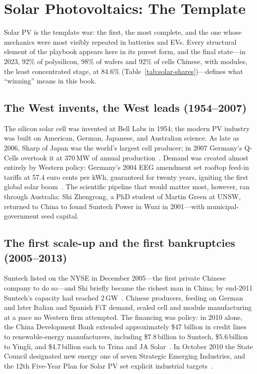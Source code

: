 \chapter{Solar Photovoltaics: The Template}
\label{ch:solar}

Solar PV is the template war: the first, the most complete, and the one whose mechanics were most visibly repeated in batteries and EVs. Every structural element of the playbook appears here in its purest form, and the final state---in 2023, 92\% of polysilicon, 98\% of wafers and 92\% of cells Chinese, with modules, the least concentrated stage, at 84.6\% (Table~\ref{tab:solar-shares})---defines what ``winning'' means in this book.

\section{The West invents, the West leads (1954--2007)}

The silicon solar cell was invented at Bell Labs in 1954; the modern PV industry was built on American, German, Japanese, and Australian science. As late as 2006, Sharp of Japan was the world's largest cell producer; in 2007 Germany's Q-Cells overtook it at 370\,MW of annual production~\cite{qcells-sharp}. Demand was created almost entirely by Western policy: Germany's 2004 EEG amendment set rooftop feed-in tariffs at 57.4 euro cents per kWh, guaranteed for twenty years, igniting the first global solar boom~\cite{german-fit}. The scientific pipeline that would matter most, however, ran through Australia: Shi Zhengrong, a PhD student of Martin Green at UNSW, returned to China to found Suntech Power in Wuxi in 2001---with municipal-government seed capital.

\section{The first scale-up and the first bankruptcies (2005--2013)}

Suntech listed on the NYSE in December 2005---the first private Chinese company to do so---and Shi briefly became the richest man in China; by end-2011 Suntech's capacity had reached 2\,GW~\cite{suntech}. Chinese producers, feeding on German and later Italian and Spanish FiT demand, scaled cell and module manufacturing at a pace no Western firm attempted. The financing was policy: in 2010 alone, the China Development Bank extended approximately \$47 billion in credit lines to renewable-energy manufacturers, including \$7.8\,billion to Suntech, \$5.6\,billion to Yingli, and \$4.7\,billion each to Trina and JA Solar~\cite{cdb-credit}. In October 2010 the State Council designated new energy one of seven Strategic Emerging Industries, and the 12th Five-Year Plan for Solar PV set explicit industrial targets~\cite{sei-solar}.


